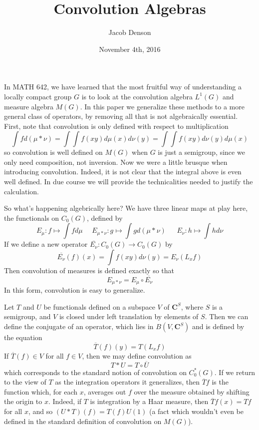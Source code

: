 \documentclass{article}
\title{Convolution Algebras}
\author{Jacob Denson}
\date{November 4th, 2016}
\theoremstyle{plain}
\theoremstyle{definition}
\begin{document}
\maketitle

In MATH 642, we have learned that the most fruitful way of understanding a locally compact group $G$ is to look at the convolution algebra $L^1(G)$ and measure algebra $M(G)$. In this paper we generalize these methods to a more general class of operators, by removing all that is not algebraically essential. First, note that convolution is only defined with respect to multiplication
%
\[ \int f d(\mu * \nu) = \int \int f(xy) d\mu(x) d\nu(y) = \int \int f(xy) d\nu(y) d\mu(x) \]
%
so convolution is well defined on $M(G)$ when $G$ is just a semigroup, since we only need composition, not inversion. Now we were a little brusque when introducing convolution. Indeed, it is not clear that the integral above is even well defined. In due course we will provide the technicalities needed to justify the calculation.

So what's happening algebrically here? We have three linear maps at play here, the functionals on $C_0(G)$, defined by
%
\[ E_\mu: f \mapsto \int f d\mu\ \ \ \ \ \ E_{\mu * \nu}: g \mapsto \int g d(\mu * \nu)\ \ \ \ \ \ \ E_\nu: h \mapsto \int h d\nu \]
%
If we define a new operator $\overline{E_\nu}: C_0(G) \to C_0(G)$ by
%
\[ \overline{E_\nu}(f)(x) = \int f(xy) d\nu(y) = E_\nu(L_x f) \]
%
Then convolution of measures is defined exactly so that
%
\[ E_{\mu * \nu} = E_\mu \circ \overline{E_\nu} \]
%
In this form, convolution is easy to generalize.

Let $T$ and $U$ be functionals defined on a subspace $V$ of $\mathbf{C}^S$, where $S$ is a semigroup, and $V$ is closed under left translation by elements of $S$. Then we can define the conjugate of an operator, which lies in $B(V,\mathbf{C}^S)$ and is defined by the equation
%
\[ \overline{T}(f)(y) = T(L_x f) \]
%
If $\overline{T}(f) \in V$ for all $f \in V$, then we may define convolution as
%
\[ T * U = T \circ \overline{U} \]
%
which corresponds to the standard notion of convolution on $C_0^*(G)$. If we return to the view of $T$ as the integration operators it generalizes, then $\overline{T}f$ is the function which, for each $x$, averages out $f$ over the measure obtained by shifting the origin to $x$. Indeed, if $T$ is integration by a Haar measure, then $\overline{T} f (x) = Tf$ for all $x$, and so $(U * T)(f) = T(f) U(1)$ (a fact which wouldn't even be defined in the standard definition of convolution on $M(G)$).
\end{document}
